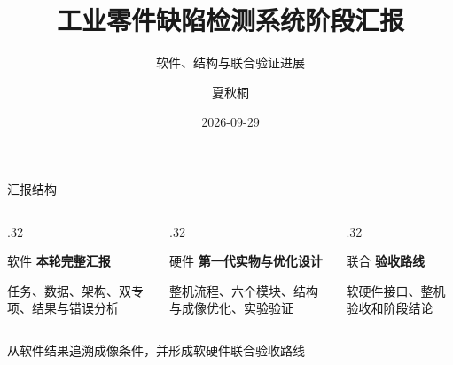 \documentclass[aspectratio=169,10pt]{beamer}
\author{夏秋桐}
\title{工业零件缺陷检测系统阶段汇报}
\subtitle{软件、结构与联合验证进展}
\date{2026-09-29}
\newcommand{\OverviewNav}{%
  \GearProSetMajor{总览}%
  \GearProHideMinorNav%
}
\begin{document}
\begin{frame}[plain]
  \titlepage
\end{frame}

\OverviewNav
\begin{frame}{汇报结构}
  \vspace{.25em}
  \begin{columns}[T,onlytextwidth]
    \begin{column}{.32\textwidth}
      \begin{block}{软件}
        \textbf{本轮完整汇报}

        \vspace{.45em}
        任务、数据、架构、双专项、结果与错误分析
      \end{block}
    \end{column}
    \begin{column}{.32\textwidth}
      \begin{exampleblock}{硬件}
        \textbf{第一代实物与优化设计}

        \vspace{.45em}
        整机流程、六个模块、结构与成像优化、实验验证
      \end{exampleblock}
    \end{column}
    \begin{column}{.32\textwidth}
      \begin{exampleblock}{联合}
        \textbf{验收路线}

        \vspace{.45em}
        软硬件接口、整机验收和阶段结论
      \end{exampleblock}
    \end{column}
  \end{columns}

  \vfill
  \centering
  \textcolor{seugreen}{\large 从软件结果追溯成像条件，并形成软硬件联合验收路线}
\end{frame}
\end{document}
